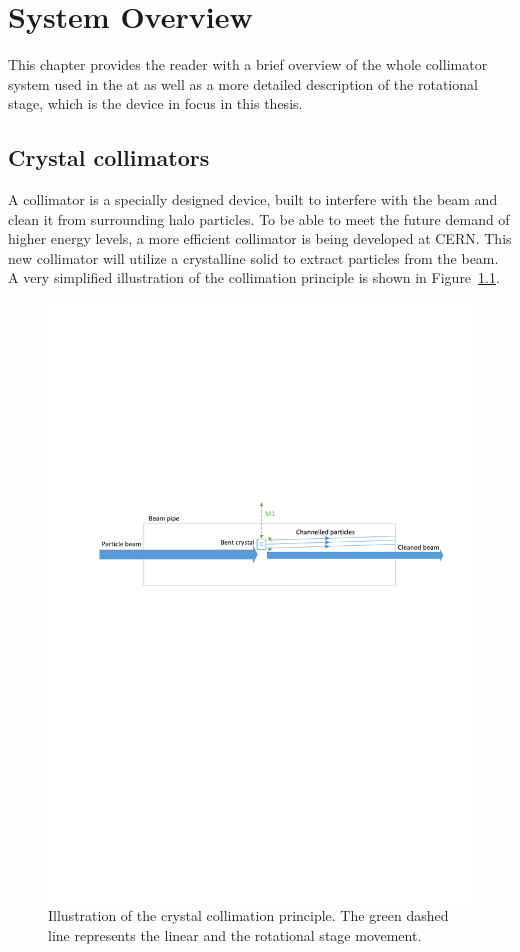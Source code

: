 \chapter{System Overview}\label{cha:systemOverview}
This chapter provides the reader with a brief overview of the whole collimator system used in the \abbrLHC at \abbrCERN as well as a more detailed description of the rotational stage, which is the device in focus in this thesis.

\section{Crystal collimators}
A collimator is a specially designed device, built to interfere with the beam and clean it from surrounding halo particles. To be able to meet the future demand of higher energy levels, a more efficient collimator is being developed at CERN. This new collimator will utilize a crystalline solid to extract particles from the beam. A very simplified illustration of the collimation principle is shown in Figure~\ref{fig:collimation}.

\begin{figure}[h]
  \centering %
  \includegraphics[width=1\textwidth, trim= 2cm 15cm 1cm 10cm, clip=true]{fig/matlab/collimation}
  \caption{\label{fig:collimation}Illustration of the crystal collimation principle. The green dashed line represents the linear and the rotational stage movement.}
\end{figure}

